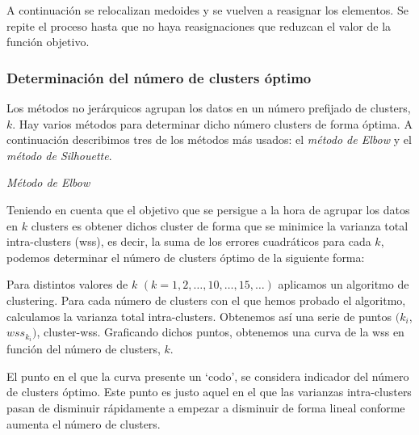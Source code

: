 A continuación se relocalizan medoides y se vuelven a reasignar los elementos. Se repite el proceso hasta que no haya reasignaciones que reduzcan 
el valor de la función objetivo.



\subsubsection{Determinación del número de clusters óptimo}

Los métodos no jerárquicos agrupan los datos en un número prefijado de clusters, $k$. Hay varios métodos para determinar
dicho número clusters de forma óptima. A continuación describimos tres de los métodos más usados: el \textit{método de Elbow} y el \textit{método de Silhouette}. \newline

\textit{Método de Elbow} \newline

Teniendo en cuenta que el objetivo que se persigue a la hora de agrupar los datos en $k$ clusters es obtener dichos cluster de forma que se minimice la varianza total intra-clusters (wss), es decir,
la suma de los errores cuadráticos para cada $k$, podemos determinar el número de clusters óptimo de la siguiente forma: \newline

Para distintos valores de $k$ $ (k = 1,2,\dots,10,\dots,15,\dots)$ aplicamos un algoritmo de clustering. Para cada número de clusters con el que hemos probado el algoritmo, calculamos la varianza
total intra-clusters. Obtenemos así una serie de puntos $ (k_{i}$,$wss_{k_{i}})$, cluster-wss. Graficando dichos puntos, obtenemos una curva de la wss en función del número de clusters, $k$. \newline

El punto en el que la curva presente un `codo', se considera indicador del número de clusters óptimo. Este punto es justo aquel en el que las varianzas intra-clusters pasan de disminuir rápidamente
a empezar a disminuir de forma lineal conforme aumenta el número de clusters. \newline

